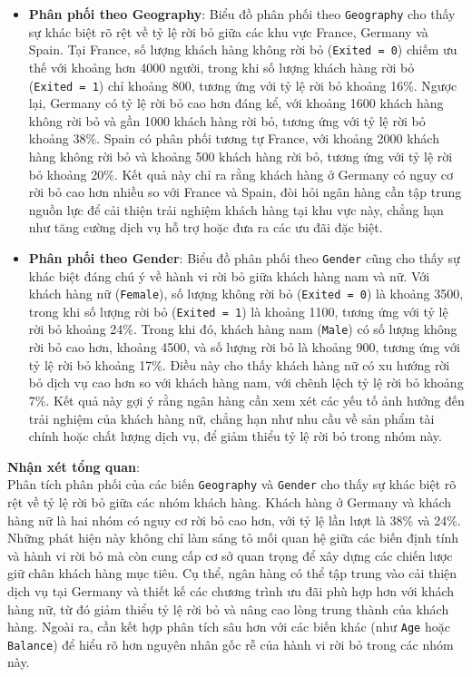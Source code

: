 \documentclass[
]{article}
\begin{document}
\begin{itemize}
\item
  \textbf{Phân phối theo Geography}: Biểu đồ phân phối theo
  \texttt{Geography} cho thấy sự khác biệt rõ rệt về tỷ lệ rời bỏ giữa
  các khu vực France, Germany và Spain. Tại France, số lượng khách hàng
  không rời bỏ (\texttt{Exited\ =\ 0}) chiếm ưu thế với khoảng hơn 4000
  người, trong khi số lượng khách hàng rời bỏ (\texttt{Exited\ =\ 1})
  chỉ khoảng 800, tương ứng với tỷ lệ rời bỏ khoảng 16\%. Ngược lại,
  Germany có tỷ lệ rời bỏ cao hơn đáng kể, với khoảng 1600 khách hàng
  không rời bỏ và gần 1000 khách hàng rời bỏ, tương ứng với tỷ lệ rời bỏ
  khoảng 38\%. Spain có phân phối tương tự France, với khoảng 2000 khách
  hàng không rời bỏ và khoảng 500 khách hàng rời bỏ, tương ứng với tỷ lệ
  rời bỏ khoảng 20\%. Kết quả này chỉ ra rằng khách hàng ở Germany có
  nguy cơ rời bỏ cao hơn nhiều so với France và Spain, đòi hỏi ngân hàng
  cần tập trung nguồn lực để cải thiện trải nghiệm khách hàng tại khu
  vực này, chẳng hạn như tăng cường dịch vụ hỗ trợ hoặc đưa ra các ưu
  đãi đặc biệt.
\item
  \textbf{Phân phối theo Gender}: Biểu đồ phân phối theo \texttt{Gender}
  cũng cho thấy sự khác biệt đáng chú ý về hành vi rời bỏ giữa khách
  hàng nam và nữ. Với khách hàng nữ (\texttt{Female}), số lượng không
  rời bỏ (\texttt{Exited\ =\ 0}) là khoảng 3500, trong khi số lượng rời
  bỏ (\texttt{Exited\ =\ 1}) là khoảng 1100, tương ứng với tỷ lệ rời bỏ
  khoảng 24\%. Trong khi đó, khách hàng nam (\texttt{Male}) có số lượng
  không rời bỏ cao hơn, khoảng 4500, và số lượng rời bỏ là khoảng 900,
  tương ứng với tỷ lệ rời bỏ khoảng 17\%. Điều này cho thấy khách hàng
  nữ có xu hướng rời bỏ dịch vụ cao hơn so với khách hàng nam, với chênh
  lệch tỷ lệ rời bỏ khoảng 7\%. Kết quả này gợi ý rằng ngân hàng cần xem
  xét các yếu tố ảnh hưởng đến trải nghiệm của khách hàng nữ, chẳng hạn
  như nhu cầu về sản phẩm tài chính hoặc chất lượng dịch vụ, để giảm
  thiểu tỷ lệ rời bỏ trong nhóm này.
\end{itemize}

\textbf{Nhận xét tổng quan}:\\
Phân tích phân phối của các biến \texttt{Geography} và \texttt{Gender}
cho thấy sự khác biệt rõ rệt về tỷ lệ rời bỏ giữa các nhóm khách hàng.
Khách hàng ở Germany và khách hàng nữ là hai nhóm có nguy cơ rời bỏ cao
hơn, với tỷ lệ lần lượt là 38\% và 24\%. Những phát hiện này không chỉ
làm sáng tỏ mối quan hệ giữa các biến định tính và hành vi rời bỏ mà còn
cung cấp cơ sở quan trọng để xây dựng các chiến lược giữ chân khách hàng
mục tiêu. Cụ thể, ngân hàng có thể tập trung vào cải thiện dịch vụ tại
Germany và thiết kế các chương trình ưu đãi phù hợp hơn với khách hàng
nữ, từ đó giảm thiểu tỷ lệ rời bỏ và nâng cao lòng trung thành của khách
hàng. Ngoài ra, cần kết hợp phân tích sâu hơn với các biến khác (như
\texttt{Age} hoặc \texttt{Balance}) để hiểu rõ hơn nguyên nhân gốc rễ
của hành vi rời bỏ trong các nhóm này.
\end{document}

